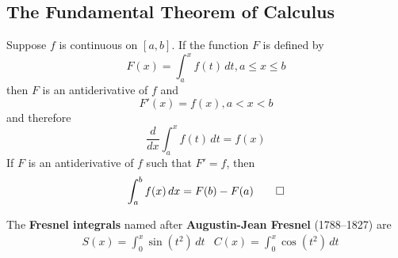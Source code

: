 \subsection{The Fundamental Theorem of Calculus}
\begin{theorem}
    Suppose \(f\) is continuous on \([a,b]\).
    If the function \(F\) is defined by \[F(x)=\int_a^xf(t)\,dt,a\leq x\leq b\]
    then \(F\) is an antiderivative of \(f\) and \[F'(x)=f(x),a<x<b\]
    and therefore\[\frac{d}{dx}\int_a^x f(t)\,dt=f(x)\]
    If \(F\) is an antiderivative of \(f\) such that \(F'=f\), then
    \[\int_a^b f(x)\,dx=F(b)-F(a)\qedhere\]
\end{theorem}
The \textbf{Fresnel integrals} named after \textbf{Augustin-Jean Fresnel} (1788--1827) are
\begin{align*}
    &S(x)=\int_0^x\sin(t^2)\,dt&C(x)=\int_0^x\cos(t^2)\,dt
\end{align*}